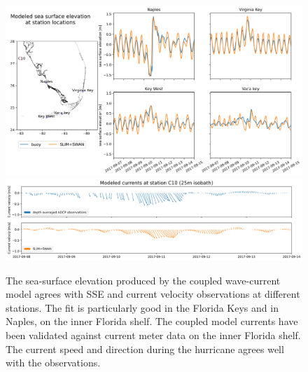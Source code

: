 \documentclass[11pt,a4paper]{article}
\begin{document}
\begin{figure}
    \centering
    \includegraphics[width=.95\textwidth]{fig/elevation_with_map.png}
    \includegraphics[width=.95\textwidth]{fig/validation_currents_C10_ww3.png}
    \caption{The sea-surface elevation produced by the coupled wave-current model agrees with SSE and current velocity observations at different stations. The fit is particularly good in the Florida Keys and in Naples, on the inner Florida shelf. The coupled model currents have been validated against current meter data on the inner Florida shelf. The current speed and direction during the hurricane agrees well with the observations.}
    \label{fig:hydro}
\end{figure}
\end{document}
